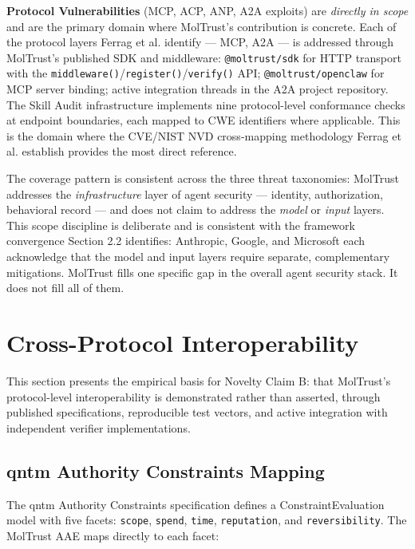 \textbf{Protocol Vulnerabilities} (MCP, ACP, ANP, A2A exploits) are \textit{directly in scope} and are the primary domain where MolTrust's contribution is concrete. Each of the protocol layers Ferrag et al. identify — MCP, A2A — is addressed through MolTrust's published SDK and middleware: \texttt{@moltrust/sdk} for HTTP transport with the \texttt{middleware()}/\texttt{register()}/\texttt{verify()} API; \texttt{@moltrust/openclaw} for MCP server binding; active integration threads in the A2A project repository. The Skill Audit infrastructure implements nine protocol-level conformance checks at endpoint boundaries, each mapped to CWE identifiers where applicable. This is the domain where the CVE/NIST NVD cross-mapping methodology Ferrag et al. establish provides the most direct reference.


The coverage pattern is consistent across the three threat taxonomies: MolTrust addresses the \textit{infrastructure} layer of agent security — identity, authorization, behavioral record — and does not claim to address the \textit{model} or \textit{input} layers. This scope discipline is deliberate and is consistent with the framework convergence Section 2.2 identifies: Anthropic, Google, and Microsoft each acknowledge that the model and input layers require separate, complementary mitigations. MolTrust fills one specific gap in the overall agent security stack. It does not fill all of them.



\section{Cross-Protocol Interoperability}

This section presents the empirical basis for Novelty Claim B: that MolTrust's protocol-level interoperability is demonstrated rather than asserted, through published specifications, reproducible test vectors, and active integration with independent verifier implementations.


\subsection{qntm Authority Constraints Mapping}

The qntm Authority Constraints specification defines a ConstraintEvaluation model with five facets: \texttt{scope}, \texttt{spend}, \texttt{time}, \texttt{reputation}, and \texttt{reversibility}. The MolTrust AAE maps directly to each facet:


